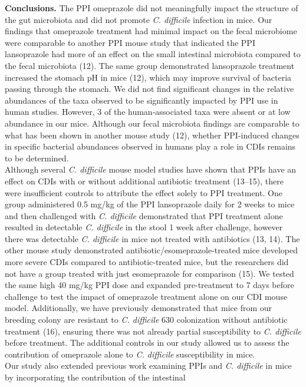 \documentclass[11pt,]{article}
\begin{document}
\textbf{Conclusions.} The PPI omeprazole did not meaningfully impact the
structure of the gut microbiota and did not promote \emph{C. difficile}
infection in mice. Our findings that omeprazole treatment had minimal
impact on the fecal microbiome were comparable to another PPI mouse
study that indicated the PPI lansoprazole had more of an effect on the
small intestinal microbiota compared to the fecal microbiota (12). The
same group demonstrated lansoprazole treatment increased the stomach pH
in mice (12), which may improve survival of bacteria passing through the
stomach. We did not find significant changes in the relative abundances
of the taxa observed to be significantly impacted by PPI use in human
studies. However, 3 of the human-associated taxa were absent or at low
abundance in our mice. Although our fecal microbiota findings are
comparable to what has been shown in another mouse study (12), whether
PPI-induced changes in specific bacterial abundances observed in humans
play a role in CDIs remains to be determined.\\
Although several \emph{C. difficile} mouse model studies have shown that
PPIs have an effect on CDIs with or without additional antibiotic
treatment (13--15), there were insufficient controls to attribute the
effect solely to PPI treatment. One group administered 0.5 mg/kg of the
PPI lansoprazole daily for 2 weeks to mice and then challenged with
\emph{C. difficile} demonstrated that PPI treatment alone resulted in
detectable \emph{C. difficile} in the stool 1 week after challenge,
however there was detectable \emph{C. difficile} in mice not treated
with antibiotics (13, 14). The other mouse study demonstrated
antibiotic/esomeprazole-treated mice developed more severe CDIs compared
to antibiotic-treated mice, but the researchers did not have a group
treated with just esomeprazole for comparison (15). We tested the same
high 40 mg/kg PPI dose and expanded pre-treatment to 7 days before
challenge to test the impact of omeprazole treatment alone on our CDI
mouse model. Additionally, we have previously demonstrated that mice
from our breeding colony are resistant to \emph{C. difficile} 630
colonization without antibiotic treatment (16), ensuring there was not
already partial susceptibility to \emph{C. difficile} before treatment.
The additional controls in our study allowed us to assess the
contribution of omeprazole alone to \emph{C. difficile} susceptibility
in mice.\\
Our study also extended previous work examining PPIs and \emph{C.
difficile} in mice by incorporating the contribution of the intestinal
\end{document}
